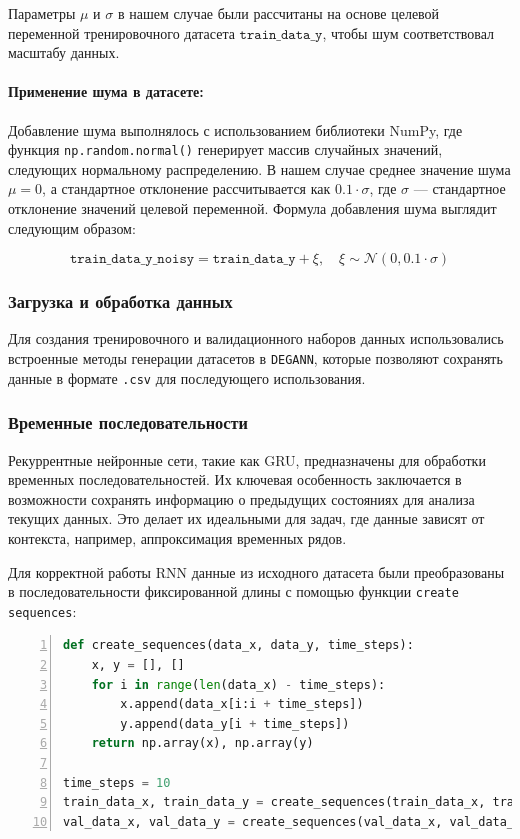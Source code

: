 Параметры $\mu$ и $\sigma$ в нашем случае были рассчитаны на основе целевой переменной тренировочного датасета $\texttt{train\_data\_y}$, чтобы шум соответствовал масштабу данных.

\paragraph{Применение шума в датасете:}
Добавление шума выполнялось с использованием библиотеки NumPy, где функция \texttt{np.random.normal()} генерирует массив случайных значений, следующих нормальному распределению. В нашем случае среднее значение шума $\mu = 0$, а стандартное отклонение рассчитывается как $0.1 \cdot \sigma$, где $\sigma$ --- стандартное отклонение значений целевой переменной. Формула добавления шума выглядит следующим образом:

\[
\texttt{train\_data\_y\_noisy} = \texttt{train\_data\_y} + \xi, \quad \xi \sim \mathcal{N}(0, 0.1 \cdot \sigma)
\]

\subsubsection{Загрузка и обработка данных}
Для создания тренировочного и валидационного наборов данных использовались встроенные методы генерации датасетов в \texttt{DEGANN}, которые позволяют сохранять данные в формате \texttt{.csv} для последующего использования.


\subsubsection{Временные последовательности}
Рекуррентные нейронные сети, такие как GRU, предназначены для обработки временных последовательностей. Их ключевая особенность заключается в возможности сохранять информацию о предыдущих состояниях для анализа текущих данных. Это делает их идеальными для задач, где данные зависят от контекста, например, аппроксимация временных рядов.

Для корректной работы RNN данные из исходного датасета были преобразованы в последовательности фиксированной длины с помощью функции \texttt{create sequences}:

\begin{lstlisting}[language=Python, breaklines, caption=Создание временных последовательностей,numbers=left]
def create_sequences(data_x, data_y, time_steps):
    x, y = [], []
    for i in range(len(data_x) - time_steps):
        x.append(data_x[i:i + time_steps])
        y.append(data_y[i + time_steps])
    return np.array(x), np.array(y)

time_steps = 10
train_data_x, train_data_y = create_sequences(train_data_x, train_data_y, time_steps)
val_data_x, val_data_y = create_sequences(val_data_x, val_data_y, time_steps)
\end{lstlisting}

